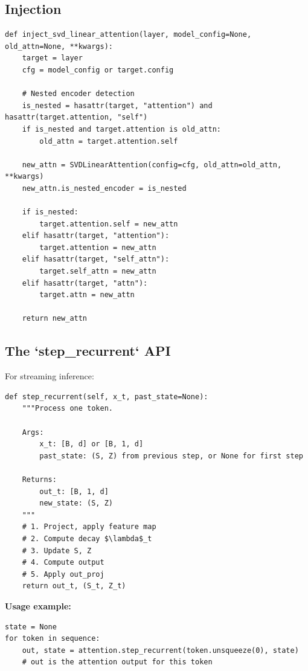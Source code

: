 \subsection{Injection}

\begin{lstlisting}
def inject_svd_linear_attention(layer, model_config=None, old_attn=None, **kwargs):
    target = layer
    cfg = model_config or target.config
    
    # Nested encoder detection
    is_nested = hasattr(target, "attention") and hasattr(target.attention, "self")
    if is_nested and target.attention is old_attn:
        old_attn = target.attention.self
    
    new_attn = SVDLinearAttention(config=cfg, old_attn=old_attn, **kwargs)
    new_attn.is_nested_encoder = is_nested
    
    if is_nested:
        target.attention.self = new_attn
    elif hasattr(target, "attention"):
        target.attention = new_attn
    elif hasattr(target, "self_attn"):
        target.self_attn = new_attn
    elif hasattr(target, "attn"):
        target.attn = new_attn
    
    return new_attn
\end{lstlisting}

\subsection{The `step\_recurrent` API}

For streaming inference:

\begin{lstlisting}
def step_recurrent(self, x_t, past_state=None):
    """Process one token.
    
    Args:
        x_t: [B, d] or [B, 1, d]
        past_state: (S, Z) from previous step, or None for first step
    
    Returns:
        out_t: [B, 1, d]
        new_state: (S, Z)
    """
    # 1. Project, apply feature map
    # 2. Compute decay $\lambda$_t
    # 3. Update S, Z
    # 4. Compute output
    # 5. Apply out_proj
    return out_t, (S_t, Z_t)
\end{lstlisting}

\textbf{Usage example:}

\begin{lstlisting}
state = None
for token in sequence:
    out, state = attention.step_recurrent(token.unsqueeze(0), state)
    # out is the attention output for this token
\end{lstlisting}

